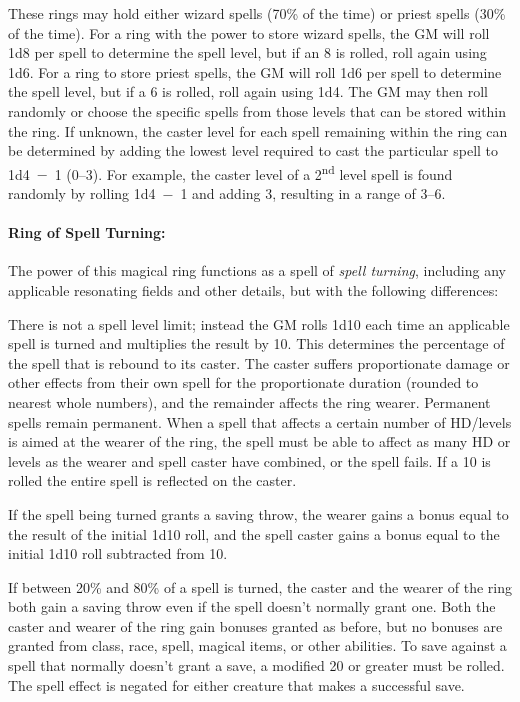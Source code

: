 \begin{multicols}{2}
These rings may hold either wizard spells (70\% of the time) or priest spells (30\% of the time).  For a ring with the power to store wizard spells, the GM will roll 1d8 per spell to determine the spell level, but if an 8 is rolled, roll again using 1d6.  For a ring to store priest spells, the GM will roll 1d6 per spell to determine the spell level, but if a 6 is rolled, roll again using 1d4.  The GM may then roll randomly or choose the specific spells from those levels that can be stored within the ring.  If unknown, the caster level for each spell remaining within the ring can be determined by adding the lowest level required to cast the particular spell to 1d4~$-$~1 (0--3).  For example, the caster level of a 2\textsuperscript{nd} level spell is found randomly by rolling 1d4~$-$~1 and adding 3, resulting in a range of 3--6.

\paragraph{Ring of Spell Turning:}  The power of this magical ring functions as a spell of \textit{spell turning}, including any applicable resonating fields and other details, but with the following differences:

There is not a spell level limit; instead the GM rolls 1d10 each time an applicable spell is turned and multiplies the result by 10.  This determines the percentage of the spell that is rebound to its caster.  The caster suffers proportionate damage or other effects from their own spell for the proportionate duration (rounded to nearest whole numbers), and the remainder affects the ring wearer.  Permanent spells remain permanent.  When a spell that affects a certain number of HD/levels is aimed at the wearer of the ring, the spell must be able to affect as many HD or levels as the wearer and spell caster have combined, or the spell fails.  If a 10 is rolled the entire spell is reflected on the caster.  

If the spell being turned grants a saving throw, the wearer gains a bonus equal to the result of the initial 1d10 roll, and the spell caster gains a bonus equal to the initial 1d10 roll subtracted from 10.  

If between 20\% and 80\% of a spell is turned, the caster and the wearer of the ring both gain a saving throw even if the spell doesn't normally grant one.  Both the caster and wearer of the ring gain bonuses granted as before, but no bonuses are granted from class, race, spell, magical items, or other abilities.  To save against a spell that normally doesn't grant a save, a modified 20 or greater must be rolled.  The spell effect is negated for either creature that makes a successful save.


\end{multicols}
